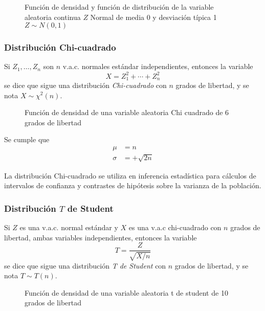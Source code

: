 \begin{figure}[h!]
\centering {}\qquad
{}
\caption{Función de densidad y función de distribución de la
variable aleatoria continua $Z$ Normal de media 0 y desviación
típica 1 \,\, $Z\sim N(0,1)$} \label{g:graficasvac}
\end{figure}

\subsubsection{Distribución Chi-cuadrado}
Si $Z_1,\ldots,Z_n$ son $n$ v.a.c. normales estándar independientes, entonces la variable
\[ 
X=Z_1^2+\cdots+Z_n^2
\]
se dice que sigue una distribución \emph{Chi-cuadrado} con $n$ grados de libertad, y se nota $X\sim\chi^2(n)$.

\begin{figure}[h!]
\centering
\scalebox{0.8}{} 
\caption{Función de densidad de una variable aleatoria Chi cuadrado de 6 grados de libertad}
\label{g:chicuadrado}
\end{figure}

Se cumple que
\begin{align*}
\mu &= n\\
\sigma &=+\sqrt{2n}
\end{align*}

La distribución Chi-cuadrado se utiliza en inferencia estadística para cálculos de intervalos de confianza y contrastes
de hipótesis sobre la varianza de la población.

\subsubsection{Distribución $T$ de Student}
Si $Z$ es una v.a.c. normal estándar y $X$ es una v.a.c chi-cuadrado con $n$ grados de libertad, ambas variables
independientes, entonces la variable
\[
T=\frac{Z}{\sqrt{X/n}}
\]
se dice que sigue una distribución \emph{T de Student} con $n$ grados de libertad, y se nota $T\sim T(n)$.

\begin{figure}[h!]
\centering
\scalebox{0.8}{} 
\caption{Función de densidad de una variable aleatoria t de student de 10 grados de libertad}
\label{g:tstudent}
\end{figure}

